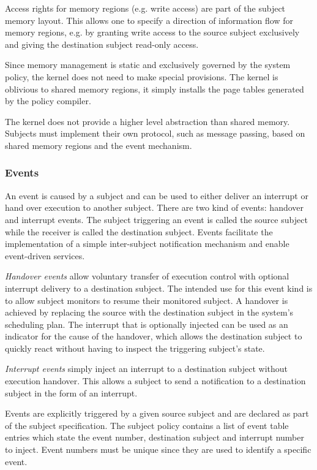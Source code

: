 Access rights for memory regions (e.g. write access) are part of the subject
memory layout. This allows one to specify a direction of information flow for
memory regions, e.g. by granting write access to the source subject exclusively
and giving the destination subject read-only access.

Since memory management is static and exclusively governed by the system policy,
the kernel does not need to make special provisions. The kernel is oblivious to
shared memory regions, it simply installs the page tables generated by the
policy compiler.

The kernel does not provide a higher level abstraction than shared memory.
Subjects must implement their own protocol, such as message passing, based on
shared memory regions and the event mechanism.

\subsubsection{Events}\label{subsubsec:events}
An event is caused by a subject and can be used to either deliver an interrupt
or hand over execution to another subject. There are two kind of events:
handover and interrupt events. The subject triggering an event is called the
source subject while the receiver is called the destination subject. Events
facilitate the implementation of a simple inter-subject notification mechanism
and enable event-driven services.

\emph{Handover events} allow voluntary transfer of execution control with
optional interrupt delivery to a destination subject. The intended use for this
event kind is to allow subject monitors to resume their monitored subject. A
handover is achieved by replacing the source with the destination subject in the
system's scheduling plan. The interrupt that is optionally injected can be used
as an indicator for the cause of the handover, which allows the destination
subject to quickly react without having to inspect the triggering subject's
state.

\emph{Interrupt events} simply inject an interrupt to a destination subject
without execution handover. This allows a subject to send a notification to a
destination subject in the form of an interrupt.

Events are explicitly triggered by a given source subject and are declared as
part of the subject specification. The subject policy contains a list of event
table entries which state the event number, destination subject and interrupt
number to inject. Event numbers must be unique since they are used to identify a
specific event.

